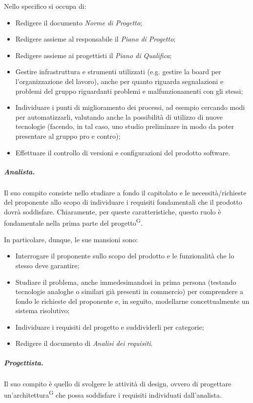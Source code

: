 Nello specifico si occupa di:
\begin{itemize}
    \item Redigere il documento \textit{Norme di Progetto};
    \item Redigere assieme al responsabile il \textit{Piano di Progetto};
    \item Redigere assieme ai progettisti il \textit{Piano di Qualifica};
    \item Gestire infrastruttura e strumenti utilizzati (e.g. gestire la board per l'organizzazione del lavoro), anche per quanto riguarda segnalazioni e problemi del gruppo riguardanti problemi e malfunzionamenti con gli stessi;
    \item Individuare i punti di miglioramento dei processi, ad esempio cercando modi per automatizzarli, valutando anche la possibilità di utilizzo di nuove tecnologie (facendo, in tal caso, uno studio preliminare in modo da poter presentare al gruppo pro e contro);
    \item Effettuare il controllo di versioni e configurazioni del prodotto software.
\end{itemize}

\subparagraph{Analista.}
Il suo compito consiste nello studiare a fondo il capitolato e le necessità/richieste del proponente allo scopo di individuare i requisiti fondamentali che il prodotto dovrà soddisfare. Chiaramente, per queste caratteristiche, questo ruolo è fondamentale nella prima parte del progetto\textsuperscript{G}.

In particolare, dunque, le sue mansioni sono:
\begin{itemize}
    \item Interrogare il proponente sullo scopo del prodotto e le funzionalità che lo stesso deve garantire;
    \item Studiare il problema, anche immedesimandosi in prima persona (testando tecnologie analoghe o similari già presenti in commercio) per comprendere a fondo le richieste del proponente e, in seguito, modellarne concettualmente un sistema risolutivo;
    \item Individuare i requisiti del progetto e suddividerli per categorie;
    \item Redigere il documento di \textit{Analisi dei requisiti}.
\end{itemize}

\subparagraph{Progettista.}
Il suo compito è quello di svolgere le attività di design, ovvero di progettare un'architettura\textsuperscript{G} che possa soddisfare i requisiti individuati dall'analista.

